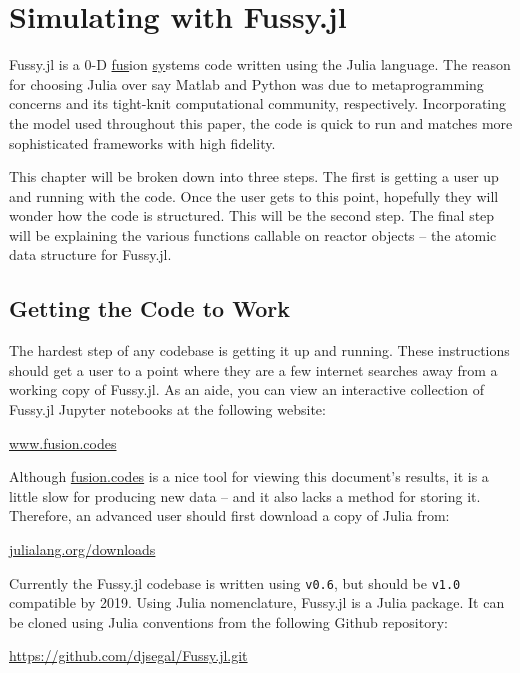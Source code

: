\chapter{Simulating with Fussy.jl}

Fussy.jl is a 0-D \underline{fus}ion \underline{sy}stems code written using the Julia language. The reason for choosing Julia over say Matlab and Python was due to metaprogramming concerns and its tight-knit  computational community, respectively. Incorporating the model used throughout this paper, the code is quick to run and matches more sophisticated frameworks with high fidelity.

This chapter will be broken down into three steps. The first is getting a user up and running with the code. Once the user gets to this point, hopefully they will wonder how the code is structured. This will be the second step. The final step will be explaining the various functions callable on reactor objects -- the atomic data structure for Fussy.jl.

\section{Getting the Code to Work}

The hardest step of any codebase is getting it up and running. These instructions should get a user to a point where they are a few internet searches away from a working copy of Fussy.jl. As an aide, you can view an interactive collection of Fussy.jl Jupyter notebooks at the following website:

{\centering \href{http://fusion.codes}{www.fusion.codes} \par }

Although \href{http://fusion.codes}{fusion.codes} is a nice tool for viewing this document's results, it is a little slow for producing new data -- and it also lacks a method for storing it. Therefore, an advanced user should first download a copy of Julia from:

{\centering \href{https://julialang.org/downloads}{julialang.org/downloads} \par }

Currently the Fussy.jl codebase is written using \texttt{v0.6}, but should be \texttt{v1.0} compatible by 2019. Using Julia nomenclature, Fussy.jl is a Julia package. It can be cloned using Julia conventions from the following Github repository:

{\centering \href{https://github.com/djsegal/Fussy.jl.git}{https://github.com/djsegal/Fussy.jl.git} \par }

